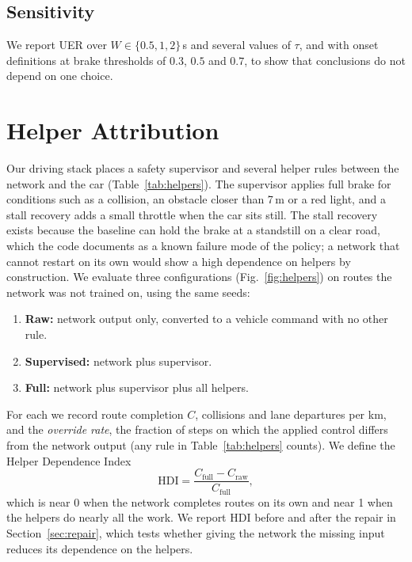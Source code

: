 \documentclass[conference]{IEEEtran}
\begin{document}
\subsection{Sensitivity}\label{sec:sens}

We report UER over $W\in\{0.5,1,2\}$\,s and several values of $\tau$,
and with onset definitions at brake thresholds of $0.3$, $0.5$ and
$0.7$, to show that conclusions do not depend on one choice.

\section{Helper Attribution}\label{sec:shield}

Our driving stack places a safety supervisor and several helper rules
between the network and the car (Table~\ref{tab:helpers}). The
supervisor applies full brake for conditions such as a collision, an
obstacle closer than 7\,m or a red light, and a stall recovery adds a
small throttle when the car sits still. The stall recovery exists because
the baseline can hold the brake at a standstill on a clear road, which
the code documents as a known failure mode of the policy; a network that
cannot restart on its own would show a high dependence on helpers by
construction. We evaluate three configurations (Fig.~\ref{fig:helpers})
on routes the network was not trained on, using the same seeds:
\begin{enumerate}
\setlength{\itemsep}{1pt}
\item \textbf{Raw:} network output only, converted to a vehicle command
with no other rule.
\item \textbf{Supervised:} network plus supervisor.
\item \textbf{Full:} network plus supervisor plus all helpers.
\end{enumerate}
For each we record route completion $C$, collisions and lane departures
per km, and the \emph{override rate}, the fraction of steps on which the
applied control differs from the network output (any rule in
Table~\ref{tab:helpers} counts). We define the Helper
Dependence Index
\begin{equation}
\mathrm{HDI}=\frac{C_{\text{full}}-C_{\text{raw}}}{C_{\text{full}}},
\end{equation}
which is near 0 when the network completes routes on its own and near 1
when the helpers do nearly all the work. We report HDI before and after
the repair in Section~\ref{sec:repair}, which tests whether giving the
network the missing input reduces its dependence on the helpers.
\end{document}
